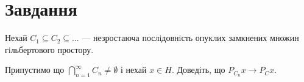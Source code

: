 

\chapter{Завдання \theHchapter}


\begin{tcolorbox}[title=Завдання]
    Нехай $C_1 \subseteq C_2 \subseteq ...$ — незростаюча послiдовнiсть
    опуклих замкнених множин гiльбертового простору.
    
    
    Припустимо що $ \bigcap\limits_{n=1}^{\infty}C_n \neq \emptyset $ 
    і нехай $ x \in H $.
    Доведіть, що
    $P_{C_n} x \rightarrow P_Cx$.
    
    
\end{tcolorbox}



